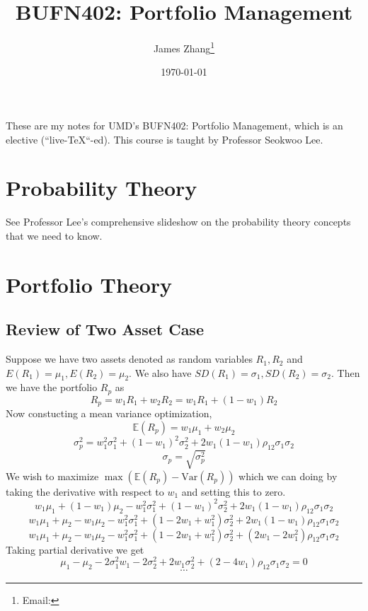 \documentclass[12pt]{scrartcl}
\newcommand{\E}{\mathbb{E}}
\begin{document}
\title{BUFN402: Portfolio Management}
\author{James Zhang\thanks{Email: }}
\date{\today}



\maketitle
    These are my notes for UMD's BUFN402: Portfolio Management, 
    which is an elective (``live-\TeX``-ed). This course is taught by Professor Seokwoo Lee. 
\tableofcontents
\newpage

\section{Probability Theory}

See Professor Lee's comprehensive slideshow on the probability theory concepts that 
we need to know.

\section{Portfolio Theory}

\subsection{Review of Two Asset Case}

Suppose we have two assets denoted as random variables $R_1, R_2$ and $E(R_1) = \mu_1, E(R_2) = \mu_2$. 
We also have $SD(R_1) = \sigma_1, SD(R_2)= \sigma_2$. Then we have the portfolio $R_p$ as
\[R_p = w_1R_1 + w_2R_2 = w_1R_1 + (1 - w_1)R_2\]
Now constucting a mean variance optimization, 
\[\E(R_p) = w_1\mu_1 + w_2\mu_2\]
\[\sigma_p^2 = w_1^2\sigma_1^2 + (1-w_1)^2\sigma_2^2 + 2w_1(1-w_1)\rho_{12}\sigma_1\sigma_2\]
\[\sigma_p = \sqrt{\sigma_p^2}\]
We wish to maximize $\max(\E(R_p) - \text{Var}(R_p))$ which we can doing by taking the 
derivative with respect to $w_1$ and setting this to zero. 
\[w_1\mu_1 + (1-w_1)\mu_2 - w_1^2\sigma_1^2 + (1-w_1)^2\sigma_2^2 + 2w_1(1-w_1)\rho_{12}\sigma_1\sigma_2\]
\[w_1\mu_1 + \mu_2-w_1\mu_2 - w_1^2\sigma_1^2 + (1-2w_1 + w_1^2)\sigma_2^2 + 2w_1(1-w_1)\rho_{12}\sigma_1\sigma_2\]
\[w_1\mu_1 + \mu_2-w_1\mu_2 - w_1^2\sigma_1^2 + (1-2w_1 + w_1^2)\sigma_2^2 + (2w_1-2w_1^2)\rho_{12}\sigma_1\sigma_2\]
Taking partial derivative we get
\[\mu_1 - \mu_2 - 2\sigma_1^2w_1 - 2\sigma_2^2 + 2w_1\sigma_2^2 + (2-4w_1)\rho_{12}\sigma_1\sigma_2 = 0\]
\[\cdots\]
\end{document}
